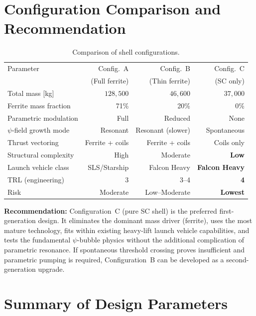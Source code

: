 \documentclass[11pt,a4paper]{article}
\begin{document}
\section{Configuration Comparison and Recommendation}\label{sec:comparison}

\begin{table}[h]
\centering
\caption{Comparison of shell configurations.}
\label{tab:comparison}
\begin{tabular}{@{}lrrr@{}}
\toprule
Parameter & Config.\ A & Config.\ B & Config.\ C \\
& (Full ferrite) & (Thin ferrite) & (SC only) \\
\midrule
Total mass [\si{kg}] & $128{,}500$ & $46{,}600$ & $37{,}000$ \\
Ferrite mass fraction & 71\% & 20\% & 0\% \\
Parametric modulation & Full & Reduced & None \\
$\psi$-field growth mode & Resonant & Resonant (slower) & Spontaneous \\
Thrust vectoring & Ferrite + coils & Ferrite + coils & Coils only \\
Structural complexity & High & Moderate & \textbf{Low} \\
Launch vehicle class & SLS/Starship & Falcon Heavy & \textbf{Falcon Heavy} \\
TRL (engineering) & 3 & 3--4 & \textbf{4} \\
Risk & Moderate & Low--Moderate & \textbf{Lowest} \\
\bottomrule
\end{tabular}
\end{table}

\textbf{Recommendation:} Configuration~C (pure SC shell) is the preferred
first-generation design. It eliminates the dominant mass driver (ferrite),
uses the most mature technology, fits within existing heavy-lift launch
vehicle capabilities, and tests the fundamental $\psi$-bubble physics
without the additional complication of parametric resonance. If
spontaneous threshold crossing proves insufficient and parametric pumping
is required, Configuration~B can be developed as a second-generation
upgrade.

\section{Summary of Design Parameters}\label{sec:summary}
\end{document}
